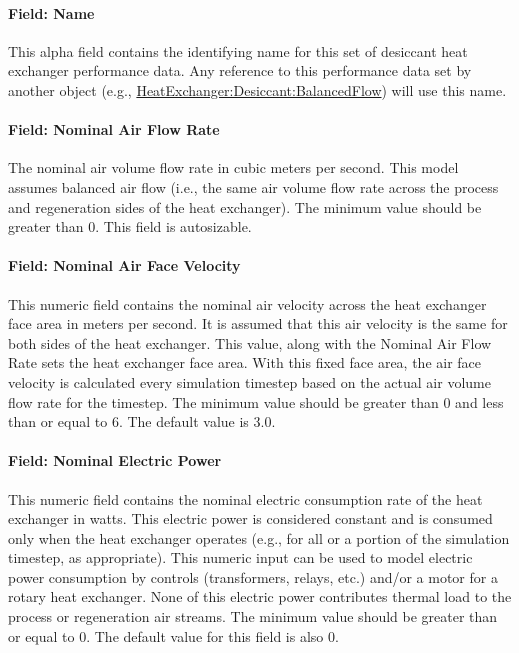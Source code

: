 \paragraph{Field: Name}\label{field-name-3-014}

This alpha field contains the identifying name for this set of desiccant heat exchanger performance data. Any reference to this performance data set by another object (e.g., \hyperref[heatexchangerdesiccantbalancedflow]{HeatExchanger:Desiccant:BalancedFlow}) will use this name.

\paragraph{Field: Nominal Air Flow Rate}\label{field-nominal-air-flow-rate}

The nominal air volume flow rate in cubic meters per second. This model assumes balanced air flow (i.e., the same air volume flow rate across the process and regeneration sides of the heat exchanger). The minimum value should be greater than 0. This field is autosizable.

\paragraph{Field: Nominal Air Face Velocity}\label{field-nominal-air-face-velocity}

This numeric field contains the nominal air velocity across the heat exchanger face area in meters per second. It is assumed that this air velocity is the same for both sides of the heat exchanger. This value, along with the Nominal Air Flow Rate sets the heat exchanger face area. With this fixed face area, the air face velocity is calculated every simulation timestep based on the actual air volume flow rate for the timestep. The minimum value should be greater than 0 and less than or equal to 6. The default value is 3.0.

\paragraph{Field: Nominal Electric Power}\label{field-nominal-electric-power-2}

This numeric field contains the nominal electric consumption rate of the heat exchanger in watts. This electric power is considered constant and is consumed only when the heat exchanger operates (e.g., for all or a portion of the simulation timestep, as appropriate). This numeric input can be used to model electric power consumption by controls (transformers, relays, etc.) and/or a motor for a rotary heat exchanger. None of this electric power contributes thermal load to the process or regeneration air streams. The minimum value should be greater than or equal to 0. The default value for this field is also 0.

